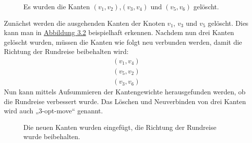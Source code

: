 \begin{figure}[bh]
\label{fig:3opt_2}
\centering
{}
\caption[Löschen von drei Kanten in 3-opt]{Es wurden die Kanten
$(v_1,v_2)$,$(v_3,v_4)$ und $(v_5,v_6)$ gelöscht.}
\end{figure}
Zunächst werden die ausgehenden Kanten der Knoten $v_1$, 
  $v_3$ und $v_5$ gelöscht. Dies kann man in
  \hyperref[fig:3opt_2]{Abbildung 3.2} beispielhaft
erkennen. Nachdem nun drei Kanten gelöscht wurden, müssen die Kanten wie
folgt neu verbunden werden, damit die Richtung der Rundreise beibehalten
wird\cite{nagata}: 
\begin{align*}
  (v_1, v_4)\\
  (v_5, v_2)\\
  (v_3, v_6)
\end{align*}
Nun kann mittels
Aufsummieren der Kantengewichte herausgefunden werden, ob die Rundreise
verbessert wurde. Das Löschen und Neuverbinden von drei Kanten wird
auch „3-opt-move“ genannt.


\begin{figure}[bh]
\centering
{}
\caption[Neues Verbinden der Kanten in 3-opt]{Die neuen Kanten wurden
eingefügt, die Richtung der Rundreise wurde beibehalten.}
\end{figure}

